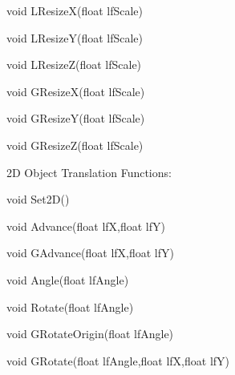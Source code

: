  void LResizeX(float lfScale) \par
 void LResizeY(float lfScale) \par
 void LResizeZ(float lfScale) \par
 \par
 void GResizeX(float lfScale) \par
 void GResizeY(float lfScale) \par
 void GResizeZ(float lfScale) \par
 \par
 2D Object Translation Functions: \par
 void Set2D() \par
 \par
 void Advance(float lfX,float lfY) \par
 void GAdvance(float lfX,float lfY) \par
 \par
 void Angle(float lfAngle) \par
 void Rotate(float lfAngle) \par
 void GRotateOrigin(float lfAngle) \par
 void GRotate(float lfAngle,float lfX,float lfY) \par
 